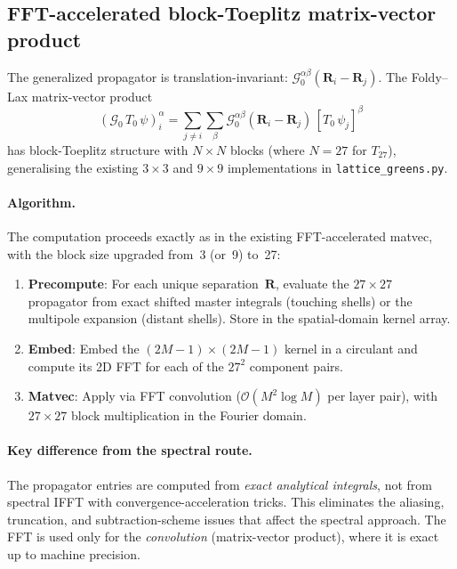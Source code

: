 \documentclass[11pt,a4paper]{article}
\newcommand{\order}{\mathcal{O}}
\newcommand{\bR}{\bm{R}}
\newcommand{\Gprop}{\mathcal{G}_0}
\theoremstyle{plain}
\theoremstyle{definition}
\theoremstyle{remark}
\begin{document}
\subsection{FFT-accelerated block-Toeplitz matrix-vector product}
\label{sec:fft-matvec}

The generalized propagator is translation-invariant:
$\Gprop^{\alpha\beta}(\bR_i - \bR_j)$.  The Foldy--Lax
matrix-vector product
\begin{equation}
  (\Gprop\,T_0\,\psi)_i^\alpha
  = \sum_{j \neq i} \sum_\beta
    \Gprop^{\alpha\beta}(\bR_i - \bR_j)\,
    [T_0\,\psi_j]^\beta
  \label{eq:foldy-matvec}
\end{equation}
has block-Toeplitz structure with $N \times N$ blocks (where
$N = 27$ for $T_{27}$), generalising the existing $3 \times 3$
and $9 \times 9$ implementations in
\texttt{lattice\_greens.py}.

\paragraph{Algorithm.}
The computation proceeds exactly as in the existing FFT-accelerated
matvec, with the block size upgraded from~3 (or~9) to~27:
\begin{enumerate}[nosep]
  \item \textbf{Precompute}: For each unique separation~$\bR$,
    evaluate the $27 \times 27$ propagator from exact shifted master
    integrals (touching shells) or the multipole expansion (distant
    shells).  Store in the spatial-domain kernel array.
  \item \textbf{Embed}: Embed the $(2M{-}1) \times (2M{-}1)$ kernel
    in a circulant and compute its 2D FFT for each of the $27^2$
    component pairs.
  \item \textbf{Matvec}: Apply via FFT convolution
    ($\order(M^2 \log M)$ per layer pair), with $27 \times 27$
    block multiplication in the Fourier domain.
\end{enumerate}

\paragraph{Key difference from the spectral route.}
The propagator entries are computed from \emph{exact analytical
integrals}, not from spectral IFFT with convergence-acceleration
tricks.  This eliminates the aliasing, truncation, and
subtraction-scheme issues that affect the spectral approach.  The FFT
is used only for the \emph{convolution} (matrix-vector product),
where it is exact up to machine precision.
\end{document}
